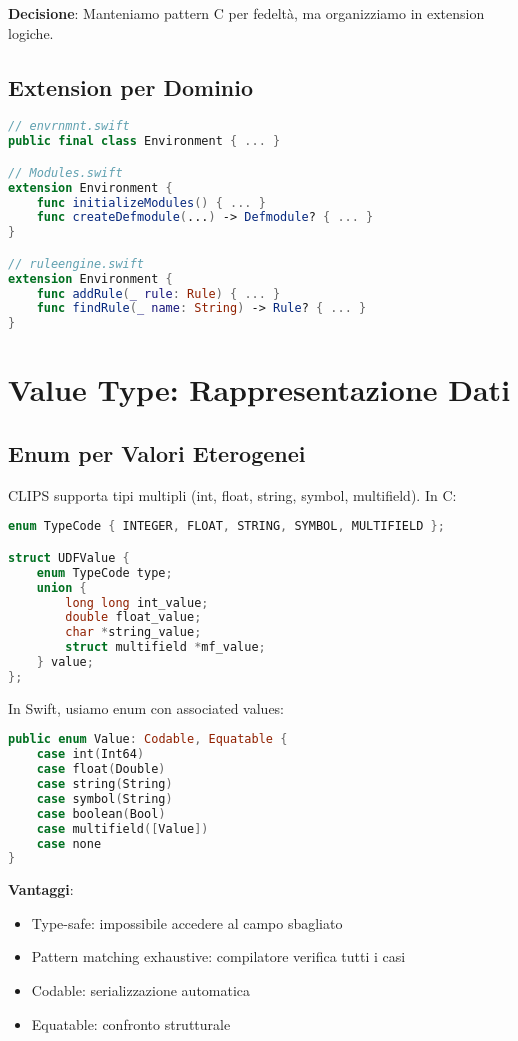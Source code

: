 \textbf{Decisione}: Manteniamo pattern C per fedeltà, ma organizziamo in extension logiche.

\subsection{Extension per Dominio}

\begin{lstlisting}[language=Swift]
// envrnmnt.swift
public final class Environment { ... }

// Modules.swift
extension Environment {
    func initializeModules() { ... }
    func createDefmodule(...) -> Defmodule? { ... }
}

// ruleengine.swift
extension Environment {
    func addRule(_ rule: Rule) { ... }
    func findRule(_ name: String) -> Rule? { ... }
}
\end{lstlisting}

\section{Value Type: Rappresentazione Dati}

\subsection{Enum per Valori Eterogenei}

CLIPS supporta tipi multipli (int, float, string, symbol, multifield). In C:

\begin{lstlisting}[language=C]
enum TypeCode { INTEGER, FLOAT, STRING, SYMBOL, MULTIFIELD };

struct UDFValue {
    enum TypeCode type;
    union {
        long long int_value;
        double float_value;
        char *string_value;
        struct multifield *mf_value;
    } value;
};
\end{lstlisting}

In Swift, usiamo enum con associated values:

\begin{lstlisting}[language=Swift]
public enum Value: Codable, Equatable {
    case int(Int64)
    case float(Double)
    case string(String)
    case symbol(String)
    case boolean(Bool)
    case multifield([Value])
    case none
}
\end{lstlisting}

\textbf{Vantaggi}:
\begin{itemize}
\item Type-safe: impossibile accedere al campo sbagliato
\item Pattern matching exhaustive: compilatore verifica tutti i casi
\item Codable: serializzazione automatica
\item Equatable: confronto strutturale
\end{itemize}

